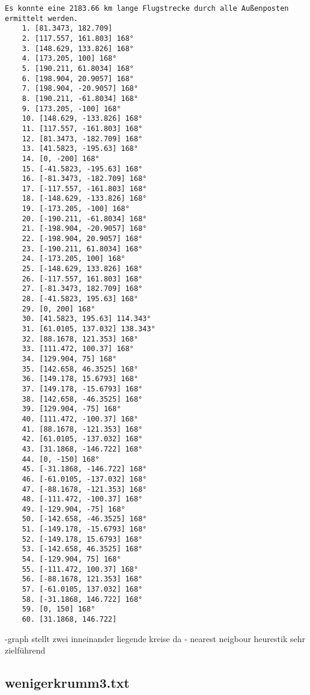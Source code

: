 \documentclass[a4paper,10pt,ngerman]{scrartcl}
\begin{document}
    \begin{lstlisting}[frame=single, title=Programmausgabe wenigerkrumm2.txt, breaklines=true,label={lst:lstlisting4}]
    Es konnte eine 2183.66 km lange Flugstrecke durch alle Außenposten ermittelt werden.
    1. [81.3473, 182.709]
    2. [117.557, 161.803] 168°
    3. [148.629, 133.826] 168°
    4. [173.205, 100] 168°
    5. [190.211, 61.8034] 168°
    6. [198.904, 20.9057] 168°
    7. [198.904, -20.9057] 168°
    8. [190.211, -61.8034] 168°
    9. [173.205, -100] 168°
    10. [148.629, -133.826] 168°
    11. [117.557, -161.803] 168°
    12. [81.3473, -182.709] 168°
    13. [41.5823, -195.63] 168°
    14. [0, -200] 168°
    15. [-41.5823, -195.63] 168°
    16. [-81.3473, -182.709] 168°
    17. [-117.557, -161.803] 168°
    18. [-148.629, -133.826] 168°
    19. [-173.205, -100] 168°
    20. [-190.211, -61.8034] 168°
    21. [-198.904, -20.9057] 168°
    22. [-198.904, 20.9057] 168°
    23. [-190.211, 61.8034] 168°
    24. [-173.205, 100] 168°
    25. [-148.629, 133.826] 168°
    26. [-117.557, 161.803] 168°
    27. [-81.3473, 182.709] 168°
    28. [-41.5823, 195.63] 168°
    29. [0, 200] 168°
    30. [41.5823, 195.63] 114.343°
    31. [61.0105, 137.032] 138.343°
    32. [88.1678, 121.353] 168°
    33. [111.472, 100.37] 168°
    34. [129.904, 75] 168°
    35. [142.658, 46.3525] 168°
    36. [149.178, 15.6793] 168°
    37. [149.178, -15.6793] 168°
    38. [142.658, -46.3525] 168°
    39. [129.904, -75] 168°
    40. [111.472, -100.37] 168°
    41. [88.1678, -121.353] 168°
    42. [61.0105, -137.032] 168°
    43. [31.1868, -146.722] 168°
    44. [0, -150] 168°
    45. [-31.1868, -146.722] 168°
    46. [-61.0105, -137.032] 168°
    47. [-88.1678, -121.353] 168°
    48. [-111.472, -100.37] 168°
    49. [-129.904, -75] 168°
    50. [-142.658, -46.3525] 168°
    51. [-149.178, -15.6793] 168°
    52. [-149.178, 15.6793] 168°
    53. [-142.658, 46.3525] 168°
    54. [-129.904, 75] 168°
    55. [-111.472, 100.37] 168°
    56. [-88.1678, 121.353] 168°
    57. [-61.0105, 137.032] 168°
    58. [-31.1868, 146.722] 168°
    59. [0, 150] 168°
    60. [31.1868, 146.722]
    \end{lstlisting}

    -graph stellt zwei inneinander liegende kreise da
    - nearest neigbour heurestik sehr zielführend

    \subsection{wenigerkrumm3.txt}\label{subsec:wenigerkrumm3.txt}
\end{document}
